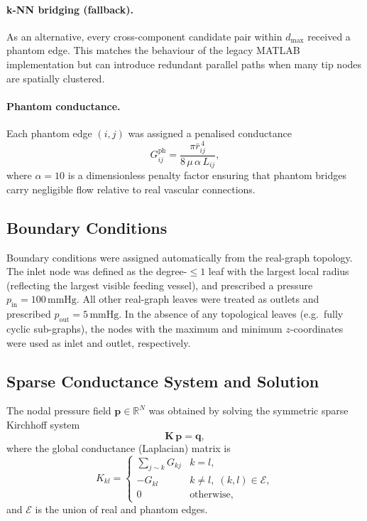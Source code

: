\documentclass[11pt]{article}
\begin{document}
\paragraph{k-NN bridging (fallback).}
As an alternative, every cross-component candidate pair within $d_\mathrm{max}$
received a phantom edge.  This matches the behaviour of the legacy MATLAB
implementation but can introduce redundant parallel paths when many tip nodes
are spatially clustered.

\paragraph{Phantom conductance.}
Each phantom edge $(i,j)$ was assigned a penalised conductance
%
\begin{equation}
  G^\mathrm{ph}_{ij} = \frac{\pi \bar{r}_{ij}^{\,4}}{8\,\mu\,\alpha\,L_{ij}},
\end{equation}
%
where $\alpha = 10$ is a dimensionless penalty factor ensuring that phantom
bridges carry negligible flow relative to real vascular connections.

\subsection{Boundary Conditions}

Boundary conditions were assigned automatically from the real-graph topology.
The inlet node was defined as the degree-$\leq 1$ leaf with the largest local
radius (reflecting the largest visible feeding vessel), and prescribed a pressure
$p_\mathrm{in} = 100\,\mathrm{mmHg}$.  All other real-graph leaves were treated
as outlets and prescribed $p_\mathrm{out} = 5\,\mathrm{mmHg}$.  In the absence
of any topological leaves (e.g.\ fully cyclic sub-graphs), the nodes with the
maximum and minimum $z$-coordinates were used as inlet and outlet, respectively.

\subsection{Sparse Conductance System and Solution}

The nodal pressure field $\mathbf{p} \in \mathbb{R}^N$ was obtained by solving
the symmetric sparse Kirchhoff system
%
\begin{equation}
  \mathbf{K}\,\mathbf{p} = \mathbf{q},
\end{equation}
%
where the global conductance (Laplacian) matrix is
%
\begin{equation}
  K_{kl} = \begin{cases}
    \displaystyle\sum_{j \sim k} G_{kj} & k = l, \\[6pt]
    -G_{kl} & k \neq l, \; (k,l) \in \mathcal{E}, \\
    0 & \text{otherwise},
  \end{cases}
\end{equation}
%
and $\mathcal{E}$ is the union of real and phantom edges.
\end{document}
